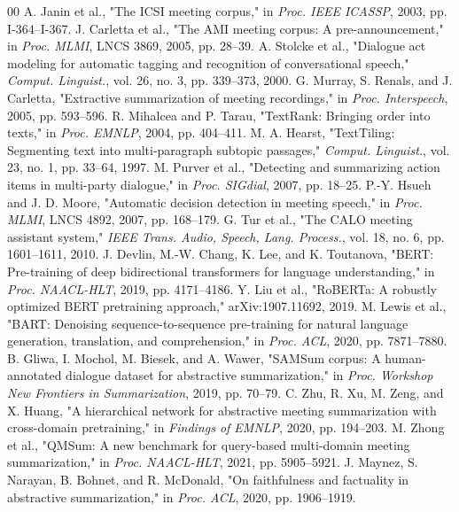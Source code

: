 \documentclass[conference]{IEEEtran}
\begin{document}
\begin{thebibliography}{00}
 A. Janin et al., "The ICSI meeting corpus," in \textit{Proc. IEEE ICASSP}, 2003, pp. I-364--I-367.
 J. Carletta et al., "The AMI meeting corpus: A pre-announcement," in \textit{Proc. MLMI}, LNCS 3869, 2005, pp. 28--39.
 A. Stolcke et al., "Dialogue act modeling for automatic tagging and recognition of conversational speech," \textit{Comput. Linguist.}, vol. 26, no. 3, pp. 339--373, 2000.
 G. Murray, S. Renals, and J. Carletta, "Extractive summarization of meeting recordings," in \textit{Proc. Interspeech}, 2005, pp. 593--596.
 R. Mihalcea and P. Tarau, "TextRank: Bringing order into texts," in \textit{Proc. EMNLP}, 2004, pp. 404--411.
 M. A. Hearst, "TextTiling: Segmenting text into multi-paragraph subtopic passages," \textit{Comput. Linguist.}, vol. 23, no. 1, pp. 33--64, 1997.
 M. Purver et al., "Detecting and summarizing action items in multi-party dialogue," in \textit{Proc. SIGdial}, 2007, pp. 18--25.
 P.-Y. Hsueh and J. D. Moore, "Automatic decision detection in meeting speech," in \textit{Proc. MLMI}, LNCS 4892, 2007, pp. 168--179.
 G. Tur et al., "The CALO meeting assistant system," \textit{IEEE Trans. Audio, Speech, Lang. Process.}, vol. 18, no. 6, pp. 1601--1611, 2010.
 J. Devlin, M.-W. Chang, K. Lee, and K. Toutanova, "BERT: Pre-training of deep bidirectional transformers for language understanding," in \textit{Proc. NAACL-HLT}, 2019, pp. 4171--4186.
 Y. Liu et al., "RoBERTa: A robustly optimized BERT pretraining approach," arXiv:1907.11692, 2019.
 M. Lewis et al., "BART: Denoising sequence-to-sequence pre-training for natural language generation, translation, and comprehension," in \textit{Proc. ACL}, 2020, pp. 7871--7880.
 B. Gliwa, I. Mochol, M. Biesek, and A. Wawer, "SAMSum corpus: A human-annotated dialogue dataset for abstractive summarization," in \textit{Proc. Workshop New Frontiers in Summarization}, 2019, pp. 70--79.
 C. Zhu, R. Xu, M. Zeng, and X. Huang, "A hierarchical network for abstractive meeting summarization with cross-domain pretraining," in \textit{Findings of EMNLP}, 2020, pp. 194--203.
 M. Zhong et al., "QMSum: A new benchmark for query-based multi-domain meeting summarization," in \textit{Proc. NAACL-HLT}, 2021, pp. 5905--5921.
 J. Maynez, S. Narayan, B. Bohnet, and R. McDonald, "On faithfulness and factuality in abstractive summarization," in \textit{Proc. ACL}, 2020, pp. 1906--1919.

\end{thebibliography}
\end{document}
